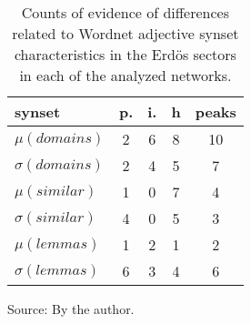 \begin{table}[h!]
\begin{center}
\caption{Counts of evidence of differences related to Wordnet adjective synset characteristics in the Erd\"os sectors in each of the analyzed networks.}
\begin{tabular}{| l || c | c | c || c |}\hline
{\bf synset} & {\bf p.} & {\bf i.} & {\bf h} & {\bf peaks} \\\hline\hline
$\mu(domains)$ & 2  & 6  & 8  & 10 \\
$\sigma(domains)$ & 2  & 4  & 5  & 7 \\\hline
$\mu(similar)$ & 1  & 0  & 7  & 4 \\
$\sigma(similar)$ & 4  & 0  & 5  & 3 \\\hline
$\mu(lemmas)$ & 1  & 2  & 1  & 2 \\
$\sigma(lemmas)$ & 6  & 3  & 4  & 6 \\\hline
\end{tabular}
\begin{flushleft}
		Source: By the author.\
\end{flushleft}
\end{center}
\end{table}
